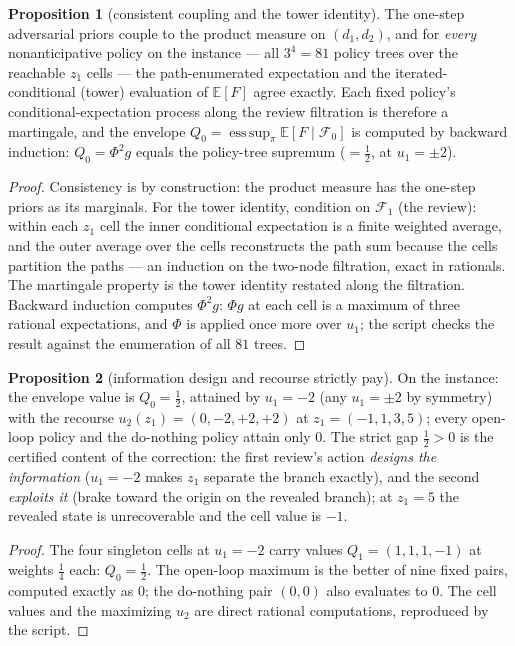 \documentclass[10pt,twocolumn]{article}
\theoremstyle{definition}
\newtheorem{proposition}{Proposition}
\begin{document}
\begin{proposition}[consistent coupling and the tower identity]
\label{prop:tower}
The one-step adversarial priors couple to the product measure on
$(d_1, d_2)$, and for \emph{every} nonanticipative policy on the instance
--- all $3^{4} = 81$ policy trees over the reachable $z_1$ cells --- the
path-enumerated expectation and the iterated-conditional (tower)
evaluation of $\mathbb{E}[F]$ agree exactly. Each fixed policy's
conditional-expectation process along the review filtration is therefore
a martingale, and the envelope
$Q_0 = \operatorname*{ess\,sup}_{\pi} \mathbb{E}[F \mid \mathcal{F}_0]$
is computed by backward induction: $Q_0 = \Phi^{2} g$ equals the
policy-tree supremum ($= \tfrac{1}{2}$, at $u_1 = \pm 2$).
\end{proposition}
\begin{proof}
Consistency is by construction: the product measure has the one-step
priors as its marginals. For the tower identity, condition on
$\mathcal{F}_1$ (the review): within each $z_1$ cell the inner
conditional expectation is a finite weighted average, and the outer
average over the cells reconstructs the path sum because the cells
partition the paths --- an induction on the two-node filtration, exact
in rationals. The martingale property is the tower identity restated
along the filtration. Backward induction computes
$\Phi^{2} g$: $\Phi g$ at each cell is a maximum of three rational
expectations, and $\Phi$ is applied once more over $u_1$; the script
checks the result against the enumeration of all $81$ trees.
\end{proof}

\begin{proposition}[information design and recourse strictly pay]
\label{prop:strict}
On the instance: the envelope value is $Q_0 = \tfrac{1}{2}$, attained by
$u_1 = -2$ (any $u_1 = \pm 2$ by symmetry) with the recourse
$u_2(z_1) = (0, -2, +2, +2)$ at $z_1 = (-1, 1, 3, 5)$; every open-loop
policy and the do-nothing policy attain only $0$. The strict gap
$\tfrac{1}{2} > 0$ is the certified content of the correction: the first
review's action \emph{designs the information} ($u_1 = -2$ makes $z_1$
separate the branch exactly), and the second \emph{exploits it}
(brake toward the origin on the revealed branch); at $z_1 = 5$ the
revealed state is unrecoverable and the cell value is $-1$.
\end{proposition}
\begin{proof}
The four singleton cells at $u_1 = -2$ carry values
$Q_1 = (1, 1, 1, -1)$ at weights $\tfrac{1}{4}$ each: $Q_0 = \tfrac12$.
The open-loop maximum is the better of nine fixed pairs, computed
exactly as $0$; the do-nothing pair $(0,0)$ also evaluates to $0$.
The cell values and the maximizing $u_2$ are direct rational
computations, reproduced by the script.
\end{proof}
\end{document}
